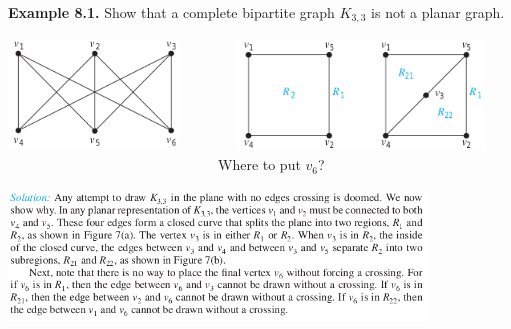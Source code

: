 \documentclass[aspectratio=169]{beamer}
\begin{document}
\begin{frame}[plain]{}

{\bf Example 8.1.} Show that a complete bipartite graph $K_{3,3}$ is not a planar graph.
  \begin{center}
  \includegraphics[height=3cm]{./img/lecture8-fig6.png}\pause \ \ \ \ \ \ \ \ 
  \includegraphics[height=3cm]{./img/lecture8-fig7.png} \ \ \\
   \ \ \ \ \ \ \ \ \ \ \ \ \ \ \ \ \ \ \ \ \ \ \ \ \
   \ \ \ \ \    Where to put $v_6$?
 \end{center}
 
 \begin{center}
   \includegraphics[height=3.5cm]{./img/lecture8-fig10.png}
 \end{center}
 
\end{frame}
\end{document}
